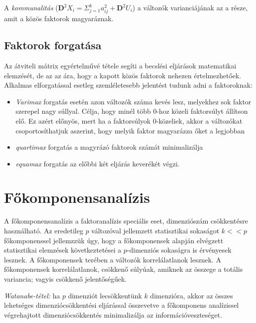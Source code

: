 A \emph{kommunalitás} ($\mathbf{D}^2X_i = \Sigma_{j=1}^k a^2_{ij} + \mathbf{D}^2U_i$) a változók varianciájának az a része, amit a közös faktorok magyaráznak.

\subsection{Faktorok forgatása}

Az átviteli mátrix egyértelművé tétele segíti a becslési eljárások matematikai elemzését, de az az ára, hogy a kapott közös faktorok nehezen értelmezhetőek. Alkalmas elforgatással esetleg szemléletesebb jelentést tudunk adni a faktoroknak:
\begin{itemize}
\item \emph{Varimax} forgatás esetén azon változók száma kevés lesz, melyekhez sok faktor szerepel nagy súllyal. Célja, hogy minél több 0-hoz közeli faktorsúlyt állítson elő. Ez azért előnyös, mert ha a faktorsúlyok 0-közeliek, akkor a változókat csoportosíthatjuk aszerint, hogy melyik faktor magyarázza őket a legjobban
\item \emph{quartimax} forgatás a magyrázó faktorok számát minimalizálja

\item \emph{equamax} forgatás az előbbi két eljárás keverékét végzi.
\end{itemize}

\section{Főkomponensanalízis}

A főkomponensanalízis a faktoranalízis speciális eset, dimenziószám csökkentésre használható. Az eredetileg $p$ változóval jellemzett statisztikai sokaságot $k<<p$ főkomponenssel jellemzzük úgy, hogy a főkomponensek alapján elvégzett statisztikai elemzések következtetései a $p$-dimenziós sokaságra is érvényesek lesznek. A főkomponensek terében a változók korrelálatlanok lesznek. A főkomponensek korrelálatlanok, csökkenő súlyúak, amiknek az összege a totális variancia; vagyis csökkenő jelentőségűek.

\emph{Watanabe-tétel:} ha $p$ dimenziót lecsökkentünk $k$ dimenzióra, akkor az összes lehetséges dimenziócsökkentési eljárással összevetve a főkomponens analízissel végrehajtott dimenziócsökkentés minimalizálja az információveszteséget.